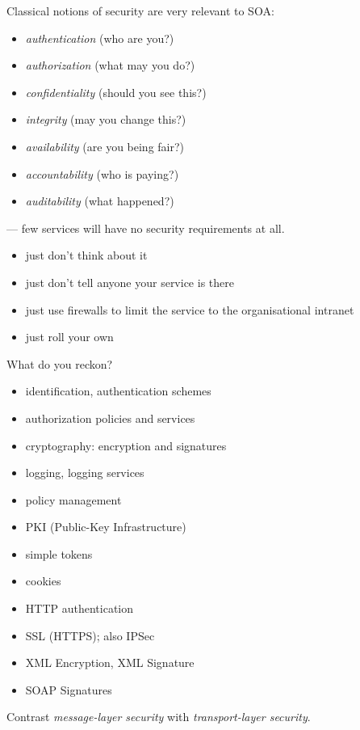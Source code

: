 \documentclass{sepslide-soa-faked} %
\begin{document}
\begin{slide}
Classical notions of security are very relevant to SOA:
	\begin{itemize}
\item \emph{authentication} (who are you?)
\item \emph{authorization} (what may you do?)
\item \emph{confidentiality} (should you see this?)
\item \emph{integrity} (may you change this?)
\item \emph{availability} (are you being fair?)
\item \emph{accountability} (who is paying?)
\item \emph{auditability} (what happened?)
	\end{itemize}
	--- few services will have no security requirements at all.
\end{slide}

\begin{slide}
	\begin{itemize}
	\item just don't think about it
	\item just don't tell anyone your service is there
	\item just use firewalls to limit the service to the 
		organisational intranet
	\item just roll your own
	\end{itemize}
What do you reckon?
\end{slide}

\begin{slide}
	\begin{itemize}
	\item identification, authentication schemes
	\item authorization policies and services
	\item cryptography: encryption and signatures
	\item logging, logging services
	\item policy management
	\end{itemize}
\end{slide}

\begin{slide}
	\begin{itemize}
	\item PKI (Public-Key Infrastructure)
	\item simple tokens
	\item cookies
	\item HTTP authentication
	\item SSL (HTTPS); also IPSec
	\item XML Encryption, XML Signature
	\item SOAP Signatures
	\end{itemize}
Contrast \emph{message-layer security} with \emph{transport-layer security}.
\end{slide}
\end{document}
